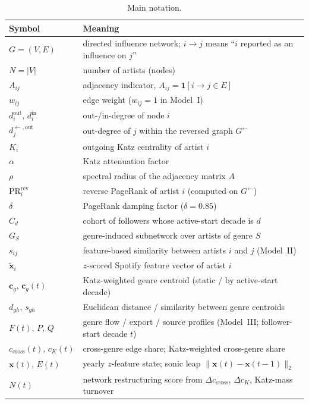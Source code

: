 \documentclass[11pt,letterpaper]{article}
\numberwithin{equation}{section}
\begin{document}
\begin{table}[htbp]
\centering
\caption{Main notation.}
\label{tab:notation}
\begin{tabular}{ll}
\toprule
Symbol & Meaning \\
\midrule
\(G=(V,E)\) & directed influence network; \(i\to j\) means ``\(i\) reported as an influence on \(j\)'' \\
\(N=|V|\)   & number of artists (nodes) \\
\(A_{ij}\)  & adjacency indicator, \(A_{ij}=\mathbf{1}[i\to j\in E]\) \\
\(w_{ij}\)  & edge weight (\(w_{ij}=1\) in Model~I) \\
\(d_i^{\text{out}},\,d_i^{\text{in}}\) & out-/in-degree of node \(i\) \\
\(d_j^{\leftarrow,\text{out}}\) & out-degree of \(j\) within the reversed graph \(G^{\leftarrow}\) \\
\(K_i\)     & outgoing Katz centrality of artist \(i\) \\
\(\alpha\)  & Katz attenuation factor \\
\(\rho\)    & spectral radius of the adjacency matrix \(A\) \\
\(\mathrm{PR}^{\text{rev}}_i\) & reverse PageRank of artist \(i\) (computed on \(G^{\leftarrow}\)) \\
\(\delta\)  & PageRank damping factor (\(\delta=0.85\)) \\
\(C_d\)     & cohort of followers whose active-start decade is \(d\) \\
\(G_S\)     & genre-induced subnetwork over artists of genre \(S\) \\
\(s_{ij}\)  & feature-based similarity between artists \(i\) and \(j\) (Model~II) \\
\(\tilde{\mathbf{x}}_i\) & \(z\)-scored Spotify feature vector of artist \(i\) \\
\(\mathbf{c}_g\), \(\mathbf{c}_g(t)\) & Katz-weighted genre centroid (static / by active-start decade) \\
\(d_{gh}\), \(s_{gh}\) & Euclidean distance / similarity between genre centroids \\
\(F(t),\,P,\,Q\) & genre flow / export / source profiles (Model~III; follower-start decade \(t\)) \\
\(c_{\mathrm{cross}}(t),\,c_K(t)\) & cross-genre edge share; Katz-weighted cross-genre share \\
\(\mathbf{x}(t),\,E(t)\) & yearly \(z\)-feature state; sonic leap \(\|\mathbf{x}(t)-\mathbf{x}(t-1)\|_2\) \\
\(N(t)\) & network restructuring score from \(\Delta c_{\mathrm{cross}}\), \(\Delta c_K\), Katz-mass turnover \\
\bottomrule
\end{tabular}
\end{table}
\end{document}
